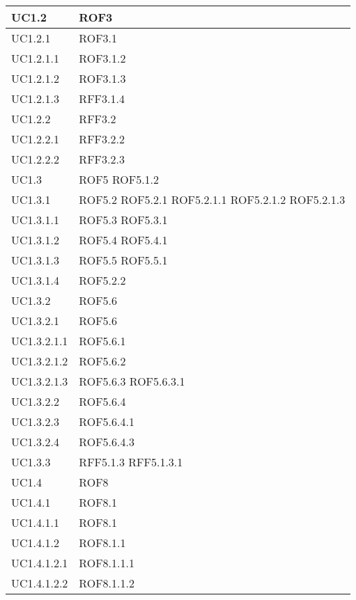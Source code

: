 \begin{center}
\begin{longtable}{| p{4cm} | p{4cm} |}
\hline
UC1.2 & ROF3 \\
\hline
UC1.2.1 & ROF3.1 \\
\hline
UC1.2.1.1 & ROF3.1.2 \\
\hline
UC1.2.1.2 & ROF3.1.3 \\
\hline
UC1.2.1.3 & RFF3.1.4 \\
\hline
UC1.2.2 & RFF3.2 \\
\hline
UC1.2.2.1 & RFF3.2.2 \\
\hline
UC1.2.2.2 & RFF3.2.3 \\
\hline
UC1.3 & ROF5 \newline ROF5.1.2 \\
\hline
UC1.3.1 & ROF5.2 \newline ROF5.2.1 \newline ROF5.2.1.1 \newline ROF5.2.1.2 \newline ROF5.2.1.3 \\
\hline
UC1.3.1.1 & ROF5.3 \newline ROF5.3.1 \\
\hline
UC1.3.1.2 & ROF5.4 \newline ROF5.4.1 \\
\hline
UC1.3.1.3 & ROF5.5 \newline ROF5.5.1 \\
\hline
UC1.3.1.4 & ROF5.2.2 \\
\hline
UC1.3.2 & ROF5.6 \\
\hline
UC1.3.2.1 & ROF5.6 \\
\hline
UC1.3.2.1.1 & ROF5.6.1 \\
\hline
UC1.3.2.1.2 & ROF5.6.2 \\
\hline
UC1.3.2.1.3 & ROF5.6.3 \newline ROF5.6.3.1 \\
\hline
UC1.3.2.2 & ROF5.6.4 \\
\hline
UC1.3.2.3 & ROF5.6.4.1 \\
\hline
UC1.3.2.4 & ROF5.6.4.3 \\
\hline
UC1.3.3 & RFF5.1.3 \newline RFF5.1.3.1 \\
\hline
UC1.4 & ROF8 \\
\hline
UC1.4.1 & ROF8.1 \\
\hline
UC1.4.1.1 & ROF8.1 \\
\hline
UC1.4.1.2 & ROF8.1.1 \\
\hline
UC1.4.1.2.1 & ROF8.1.1.1 \\
\hline
UC1.4.1.2.2 & ROF8.1.1.2 \\

\end{longtable}
\end{center}
